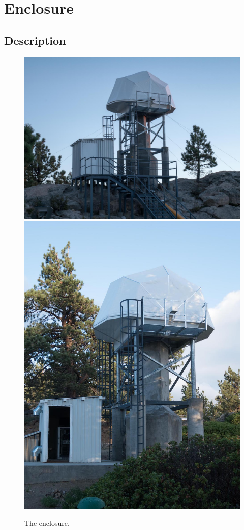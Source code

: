 \chapter{Enclosure}
\label{chapter:enclosure}

\section{Description}

\begin{figure}
\begin{center}
\ifcoatlioan
\includegraphics[width=0.8\linewidth]{figures/enclosure-coatlioan.jpg}
\fi
\ifddotioan
\includegraphics[width=0.8\linewidth]{figures/enclosure-ddotioan.jpg}
\fi
\end{center}
\caption{The {\projectname} enclosure.}
\label{figure:enclosure}
\end{figure}

